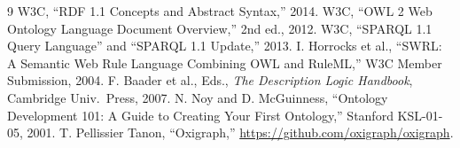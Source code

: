 \documentclass[conference]{IEEEtran}
\begin{document}
\begin{thebibliography}{9}
 W3C, ``RDF 1.1 Concepts and Abstract Syntax,'' 2014.
 W3C, ``OWL 2 Web Ontology Language Document Overview,'' 2nd ed., 2012.
 W3C, ``SPARQL 1.1 Query Language'' and ``SPARQL 1.1 Update,'' 2013.
 I. Horrocks et al., ``SWRL: A Semantic Web Rule Language Combining OWL and RuleML,'' W3C Member Submission, 2004.
 F. Baader et al., Eds., \emph{The Description Logic Handbook}, Cambridge Univ.\ Press, 2007.
 N. Noy and D. McGuinness, ``Ontology Development 101: A Guide to Creating Your First Ontology,'' Stanford KSL-01-05, 2001.
 T. Pellissier Tanon, ``Oxigraph,'' \url{https://github.com/oxigraph/oxigraph}.
\end{thebibliography}
\end{document}
